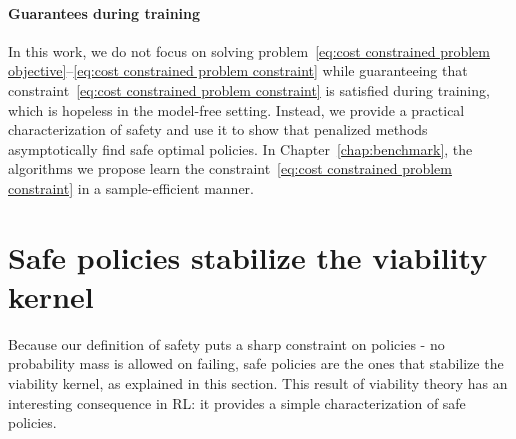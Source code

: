\paragraph{Guarantees during training} In this work, we do not focus on solving problem~\eqref{eq:cost constrained problem objective}--\eqref{eq:cost constrained problem constraint} while guaranteeing that constraint~\eqref{eq:cost constrained problem constraint} is satisfied during training, which is hopeless in the model-free setting. Instead, we provide a practical characterization of safety and use it to show that penalized methods asymptotically find safe optimal policies. In Chapter~\ref{chap:benchmark}, the algorithms we propose learn the constraint~\eqref{eq:cost constrained problem constraint} in a sample-efficient manner.

\section{Safe policies stabilize the viability kernel} \label{sec:safe policies stabilize sv}
Because our definition of safety puts a sharp constraint on policies - no probability mass is allowed on failing, safe policies are the ones that stabilize the viability kernel, as explained in this section. This result of viability theory has an interesting consequence in RL: it provides a simple characterization of safe policies.

